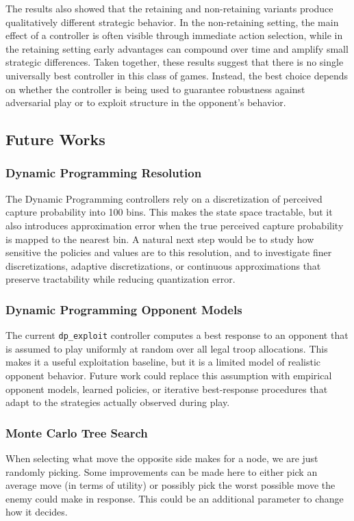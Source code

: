 \documentclass[letterpaper, 10 pt, conference]{ieeeconf}  %
\begin{document}
The results also showed that the retaining and non-retaining variants produce qualitatively different strategic behavior. In the non-retaining setting, the main effect of a controller is often visible through immediate action selection, while in the retaining setting early advantages can compound over time and amplify small strategic differences. Taken together, these results suggest that there is no single universally best controller in this class of games. Instead, the best choice depends on whether the controller is being used to guarantee robustness against adversarial play or to exploit structure in the opponent's behavior.


\subsection{Future Works}
\subsubsection{Dynamic Programming Resolution}
The Dynamic Programming controllers rely on a discretization of perceived capture probability into 100 bins. This makes the state space tractable, but it also introduces approximation error when the true perceived capture probability is mapped to the nearest bin. A natural next step would be to study how sensitive the policies and values are to this resolution, and to investigate finer discretizations, adaptive discretizations, or continuous approximations that preserve tractability while reducing quantization error.

\subsubsection{Dynamic Programming Opponent Models}
The current \texttt{dp\_exploit} controller computes a best response to an opponent that is assumed to play uniformly at random over all legal troop allocations. This makes it a useful exploitation baseline, but it is a limited model of realistic opponent behavior. Future work could replace this assumption with empirical opponent models, learned policies, or iterative best-response procedures that adapt to the strategies actually observed during play.

\subsubsection{Monte Carlo Tree Search}
When selecting what move the opposite side makes for a node, we are just randomly picking. Some improvements can be made here to either pick an average move (in terms of utility) or possibly pick the worst possible move the enemy could make in response. This could be an additional parameter to change how it decides.
\end{document}
